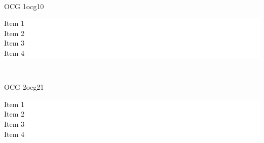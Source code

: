 \documentclass{beamer}
\newlength{\BOXlength}
\newcommand{\ocgItem}[2]{%
    \colorbox{%
        \ifcase#1 \or
        red\or%
        green\fi%
    }{\huge #2}%
}
\begin{document}
    \begin{frame}
        \centering
        \begin{minipage}[t]{\BOXlength}
            \\%
            \begin{ocg}{OCG 1}{ocg1}{0}
                \colorbox{white}{%
                    \parbox{10cm}{%
                        \ocgItem{2}{Item 1}\\%
                        \ocgItem{1}{Item 2}\\%
                        \ocgItem{2}{Item 3}\\%
                        \ocgItem{1}{Item 4}%
                    }%
                }
            \end{ocg}
        \end{minipage}\hspace{2em}
        \begin{minipage}[t]{\BOXlength}
            \\%
            \begin{ocg}{OCG 2}{ocg2}{1}
                \colorbox{white}{%
                    \parbox{10cm}{%
                        \ocgItem{1}{Item 1}\\%
                        \ocgItem{2}{Item 2}\\%
                        \ocgItem{1}{Item 3}\\%
                        \ocgItem{2}{Item 4}%
                    }%
                }
            \end{ocg}
        \end{minipage}%
\end{frame}
\end{document}
